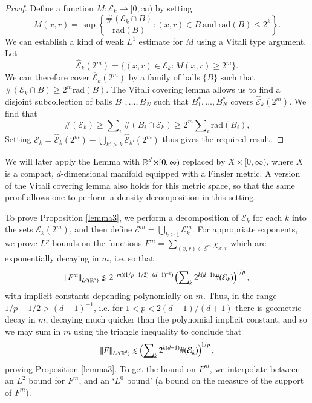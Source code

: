 \begin{proof}
    Define a function $M: \mathcal{E}_k \to [0,\infty)$ by setting
    \begin{equation}
      M(x,r) = \sup \left\{ \frac{\#(\mathcal{E}_k \cap B)}{\text{rad}(B)} : (x,r) \in B\ \text{and}\ \text{rad}(B) \leq 2^k \right\}.
    \end{equation}
    We can establish a kind of weak $L^1$ estimate for $M$ using a Vitali type argument. Let
    \begin{equation}
      \widehat{\mathcal{E}}_k(2^m) = \{ (x,r) \in \mathcal{E}_k : M(x,r) \geq 2^m \}.
    \end{equation}
    We can therefore cover $\widehat{\mathcal{E}}_k(2^m)$ by a family of balls $\{ B \}$ such that $\#(\mathcal{E}_k \cap B) \geq 2^m \text{rad}(B)$. The Vitali covering lemma allows us to find a disjoint subcollection of balls $B_1,\dots,B_N$ such that $B_1^* ,\dots, B_N^*$ covers $\widehat{\mathcal{E}}_k(2^m)$. We find that
    \begin{equation}
      \#(\mathcal{E}_k) \geq \sum\nolimits_i \#(B_i \cap \mathcal{E}_k) \geq 2^m \sum\nolimits_i \text{rad}(B_i),
    \end{equation}
    Setting $\mathcal{E}_k = \widehat{\mathcal{E}}_k(2^m) - \bigcup_{k' > k} \widehat{\mathcal{E}}_{k'}(2^m)$ thus gives the required result.
\end{proof}

\begin{remark}
  We will later apply the Lemma with $\operatorname{\mathbb{R}}^d \times [0,\infty)$ replaced by $X \times [0,\infty)$, where $X$ is a compact, $d$-dimensional manifold equipped with a Finsler metric. A version of the Vitali covering lemma also holds for this metric space, so that the same proof allows one to perform a density decomposition in this setting.
\end{remark}

To prove Proposition \ref{lemma3}, we perform a decomposition of $\mathcal{E}_k$ for each $k$ into the sets $\mathcal{E}_k(2^m)$, and then define $\mathcal{E}^m = \bigcup_{k \geq 1} \mathcal{E}_k^m$. For appropriate exponents, we prove $L^p$ bounds on the functions $F^m = \sum\nolimits_{(x,r) \in \mathcal{E}^m} \chi_{x,r}$ which are exponentially decaying in $m$, i.e. so that
%
\begin{equation}
  \| F^m \|_{L^p(\operatorname{\mathbb{R}}^d)} \lessapprox 2^{-m ( (1/p - 1/2) - (d-1)^{-1} )} \left( \sum\nolimits_k 2^{k(d-1)} \#(\mathcal{E}_k) \right)^{1/p},
\end{equation}
with implicit constants depending polynomially on $m$. Thus, in the range $1/p - 1/2 > (d-1)^{-1}$, i.e. for $1 < p < 2(d-1)/(d+1)$ there is geometric decay in $m$, decaying much quicker than the polynomial implicit constant, and so we may sum in $m$ using the triangle inequality to conclude that
%
\begin{equation}
  \| F \|_{L^p(\operatorname{\mathbb{R}}^d)} \lesssim \left( \sum\nolimits_k 2^{k(d-1)} \#(\mathcal{E}_k) \right)^{1/p},
\end{equation}
%
proving Proposition \ref{lemma3}. To get the bound on $F^m$, we interpolate between an $L^2$ bound for $F^m$, and an `$L^0$ bound' (a bound on the measure of the support of $F^m$).

